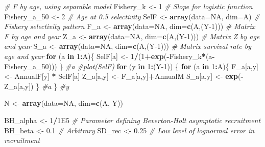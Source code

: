 \documentclass[
]{krantz}
\makeatletter
\newenvironment{Shaded}{\begin{snugshade}}{\end{snugshade}}
\newcommand{\AttributeTok}[1]{\textcolor[rgb]{0.27,0.27,0.27}{#1}}
\newcommand{\CommentTok}[1]{\textcolor[rgb]{0.37,0.37,0.37}{\textit{#1}}}
\newcommand{\ConstantTok}[1]{\textcolor[rgb]{0.37,0.37,0.37}{#1}}
\newcommand{\ControlFlowTok}[1]{\textcolor[rgb]{0.27,0.27,0.27}{\textbf{#1}}}
\newcommand{\DecValTok}[1]{\textcolor[rgb]{0.06,0.06,0.06}{#1}}
\newcommand{\FloatTok}[1]{\textcolor[rgb]{0.06,0.06,0.06}{#1}}
\newcommand{\FunctionTok}[1]{\textcolor[rgb]{0.27,0.27,0.27}{\textbf{#1}}}
\newcommand{\NormalTok}[1]{#1}
\newcommand{\OtherTok}[1]{\textcolor[rgb]{0.37,0.37,0.37}{#1}}
\newcommand{\SpecialCharTok}[1]{\textcolor[rgb]{0.43,0.43,0.43}{\textbf{#1}}}
\newenvironment{kframe}{%
\medskip{}
\setlength{\fboxsep}{.8em}
 \def\at@end@of@kframe{}%
 \ifinner\ifhmode%
  \def\at@end@of@kframe{\end{minipage}}%
  \begin{minipage}{\columnwidth}%
 \fi\fi%
 \def\FrameCommand##1{\hskip\@totalleftmargin \hskip-\fboxsep
 \colorbox{shadecolor}{##1}\hskip-\fboxsep
     \hskip-\linewidth \hskip-\@totalleftmargin \hskip\columnwidth}%
 \MakeFramed {\advance\hsize-\width
   \@totalleftmargin\z@ \linewidth\hsize
   \@setminipage}}%
 {\par\unskip\endMakeFramed%
 \at@end@of@kframe}
\renewenvironment{Shaded}{\begin{kframe}}{\end{kframe}}
\makeatother
\begin{document}
\begin{Shaded}
\begin{Highlighting}[]
\CommentTok{\# F by age, using separable model}
\NormalTok{Fishery\_k }\OtherTok{\textless{}{-}} \DecValTok{1} \CommentTok{\# Slope for logistic function}
\NormalTok{Fishery\_a\_50 }\OtherTok{\textless{}{-}} \DecValTok{2} \CommentTok{\# Age at 0.5 selectivity}
\NormalTok{SelF }\OtherTok{\textless{}{-}} \FunctionTok{array}\NormalTok{(}\AttributeTok{data=}\ConstantTok{NA}\NormalTok{, }\AttributeTok{dim=}\NormalTok{A) }\CommentTok{\# Fishery selectivity pattern}
\NormalTok{F\_a }\OtherTok{\textless{}{-}} \FunctionTok{array}\NormalTok{(}\AttributeTok{data=}\ConstantTok{NA}\NormalTok{, }\AttributeTok{dim=}\FunctionTok{c}\NormalTok{(A,(Y}\DecValTok{{-}1}\NormalTok{))) }\CommentTok{\# Matrix F by age and year}
\NormalTok{Z\_a }\OtherTok{\textless{}{-}} \FunctionTok{array}\NormalTok{(}\AttributeTok{data=}\ConstantTok{NA}\NormalTok{, }\AttributeTok{dim=}\FunctionTok{c}\NormalTok{(A,(Y}\DecValTok{{-}1}\NormalTok{))) }\CommentTok{\# Matrix Z by age and year}
\NormalTok{S\_a }\OtherTok{\textless{}{-}} \FunctionTok{array}\NormalTok{(}\AttributeTok{data=}\ConstantTok{NA}\NormalTok{, }\AttributeTok{dim=}\FunctionTok{c}\NormalTok{(A,(Y}\DecValTok{{-}1}\NormalTok{))) }\CommentTok{\# Matrix survival rate by age and year}
\ControlFlowTok{for}\NormalTok{ (a }\ControlFlowTok{in} \DecValTok{1}\SpecialCharTok{:}\NormalTok{A)\{}
\NormalTok{  SelF[a] }\OtherTok{\textless{}{-}} \DecValTok{1}\SpecialCharTok{/}\NormalTok{(}\DecValTok{1}\SpecialCharTok{+}\FunctionTok{exp}\NormalTok{(}\SpecialCharTok{{-}}\NormalTok{Fishery\_k}\SpecialCharTok{*}\NormalTok{(a}\SpecialCharTok{{-}}\NormalTok{Fishery\_a\_50)))}
\NormalTok{  \} }\CommentTok{\#a}
\CommentTok{\#plot(SelF)}
\ControlFlowTok{for}\NormalTok{ (y }\ControlFlowTok{in} \DecValTok{1}\SpecialCharTok{:}\NormalTok{(Y}\DecValTok{{-}1}\NormalTok{)) \{}
  \ControlFlowTok{for}\NormalTok{ (a }\ControlFlowTok{in} \DecValTok{1}\SpecialCharTok{:}\NormalTok{A)\{}
\NormalTok{    F\_a[a,y] }\OtherTok{\textless{}{-}}\NormalTok{ AnnualF[y] }\SpecialCharTok{*}\NormalTok{ SelF[a]}
\NormalTok{    Z\_a[a,y] }\OtherTok{\textless{}{-}}\NormalTok{ F\_a[a,y]}\SpecialCharTok{+}\NormalTok{AnnualM}
\NormalTok{    S\_a[a,y] }\OtherTok{\textless{}{-}} \FunctionTok{exp}\NormalTok{(}\SpecialCharTok{{-}}\NormalTok{Z\_a[a,y])}
\NormalTok{  \} }\CommentTok{\#a}
\NormalTok{\} }\CommentTok{\#y}

\NormalTok{N }\OtherTok{\textless{}{-}} \FunctionTok{array}\NormalTok{(}\AttributeTok{data=}\ConstantTok{NA}\NormalTok{, }\AttributeTok{dim=}\FunctionTok{c}\NormalTok{(A, Y))}

\NormalTok{BH\_alpha }\OtherTok{\textless{}{-}} \DecValTok{1}\SpecialCharTok{/}\FloatTok{1E5} \CommentTok{\# Parameter defining Beverton{-}Holt asymptotic recruitment}
\NormalTok{BH\_beta }\OtherTok{\textless{}{-}} \FloatTok{0.1} \CommentTok{\# Arbitrary}
\NormalTok{SD\_rec }\OtherTok{\textless{}{-}} \FloatTok{0.25} \CommentTok{\# Low level of lognormal error in recruitment}


\end{Highlighting}
\end{Shaded}
\end{document}
